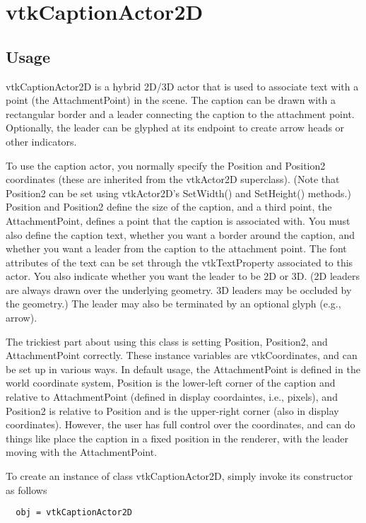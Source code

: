 \section{vtkCaptionActor2D}

\subsection{Usage}

 vtkCaptionActor2D is a hybrid 2D/3D actor that is used to associate text 
 with a point (the AttachmentPoint) in the scene. The caption can be 
 drawn with a rectangular border and a leader connecting 
 the caption to the attachment point. Optionally, the leader can be 
 glyphed at its endpoint to create arrow heads or other indicators.
 
 To use the caption actor, you normally specify the Position and Position2
 coordinates (these are inherited from the vtkActor2D superclass). (Note
 that Position2 can be set using vtkActor2D's SetWidth() and SetHeight()
 methods.)  Position and Position2 define the size of the caption, and a
 third point, the AttachmentPoint, defines a point that the caption is
 associated with.  You must also define the caption text, 
 whether you want a border around the caption, and whether you want a
 leader from the caption to the attachment point. The font attributes of 
 the text can be set through the vtkTextProperty associated to this actor.
 You also indicate whether you want
 the leader to be 2D or 3D. (2D leaders are always drawn over the
 underlying geometry. 3D leaders may be occluded by the geometry.) The
 leader may also be terminated by an optional glyph (e.g., arrow).

 The trickiest part about using this class is setting Position, Position2,
 and AttachmentPoint correctly. These instance variables are
 vtkCoordinates, and can be set up in various ways. In default usage, the
 AttachmentPoint is defined in the world coordinate system, Position is the
 lower-left corner of the caption and relative to AttachmentPoint (defined
 in display coordaintes, i.e., pixels), and Position2 is relative to
 Position and is the upper-right corner (also in display
 coordinates). However, the user has full control over the coordinates, and
 can do things like place the caption in a fixed position in the renderer,
 with the leader moving with the AttachmentPoint.

To create an instance of class vtkCaptionActor2D, simply
invoke its constructor as follows
\begin{verbatim}
  obj = vtkCaptionActor2D
\end{verbatim}
